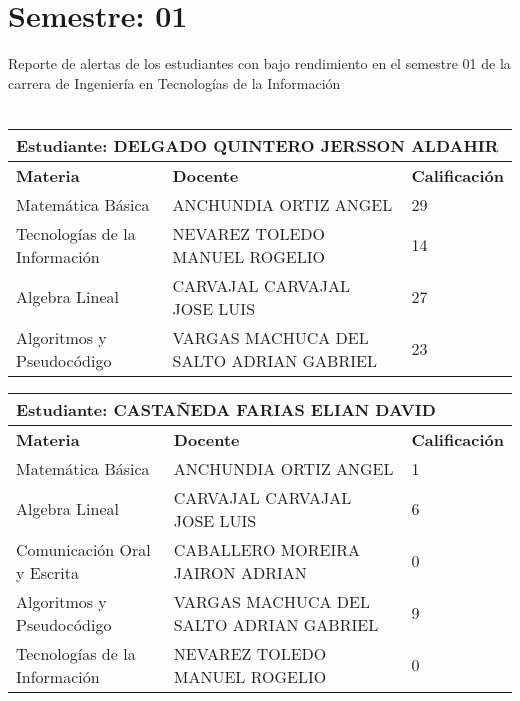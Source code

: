 \section{Semestre: 01}
        Reporte de alertas de los estudiantes con bajo rendimiento en el semestre 01 de la carrera de 
        Ingeniería en Tecnologías de la Información\\\\\small
\begin{tabularx}{\textwidth}{|p{5cm}|p{7cm}|X|}
\hline
\multicolumn{3}{|p{\dimexpr\textwidth-2\tabcolsep-2\arrayrulewidth}|}{\textbf{Estudiante: DELGADO  QUINTERO JERSSON ALDAHIR }}\\\hline
\textbf{Materia} & \textbf{Docente} & \textbf{Calificación} \\ \hline
Matemática Básica & ANCHUNDIA ORTIZ ANGEL   & 29 \\ \hline
Tecnologías de la Información  & NEVAREZ TOLEDO MANUEL ROGELIO  & 14 \\ \hline
Algebra Lineal & CARVAJAL CARVAJAL JOSE LUIS  & 27 \\ \hline
Algoritmos y Pseudocódigo & VARGAS MACHUCA DEL SALTO ADRIAN GABRIEL  & 23 \\ \hline
\end{tabularx}\vspace{10mm}
\small
\begin{tabularx}{\textwidth}{|p{5cm}|p{7cm}|X|}
\hline
\multicolumn{3}{|p{\dimexpr\textwidth-2\tabcolsep-2\arrayrulewidth}|}{\textbf{Estudiante: CASTAÑEDA FARIAS ELIAN DAVID }}\\\hline
\textbf{Materia} & \textbf{Docente} & \textbf{Calificación} \\ \hline
Matemática Básica & ANCHUNDIA ORTIZ ANGEL   & 1 \\ \hline
Algebra Lineal & CARVAJAL CARVAJAL JOSE LUIS  & 6 \\ \hline
Comunicación Oral y Escrita & CABALLERO MOREIRA JAIRON ADRIAN  & 0 \\ \hline
Algoritmos y Pseudocódigo & VARGAS MACHUCA DEL SALTO ADRIAN GABRIEL  & 9 \\ \hline
Tecnologías de la Información  & NEVAREZ TOLEDO MANUEL ROGELIO  & 0 \\ \hline
\end{tabularx}\vspace{10mm}
\small

